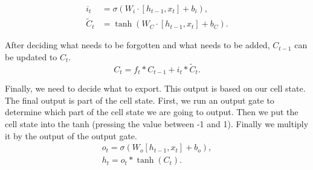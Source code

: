 \documentclass[journal,article,submit,moreauthors,pdftex]{Definitions/mdpi}
\begin{document}
\begin{equation}
    \begin{aligned}
    i_{t} &=\sigma\left(W_{i} \cdot\left[h_{t-1}, x_{t}\right]+b_{i}\right), \\
    \tilde{C}_{t} &=\tanh \left(W_{C} \cdot\left[h_{t-1}, x_{t}\right]+b_{C}\right).
    \end{aligned}
\end{equation}
\par After deciding what needs to be forgotten and what needs to be added, $C_{t-1}$ can be updated to  $C_{t}$.
\begin{equation}
    C_{t}=f_{t} * C_{t-1}+i_{t} * \tilde{C}_{t}.
\end{equation}
\par Finally, we need to decide what to export. This output is based on our cell state. The final output is part of the cell state. First, we run an output gate to determine which part of the cell state we are going to output. Then we put the cell state into the tanh (pressing the value between -1 and 1). Finally we multiply it by the output of the output gate.
\begin{equation}
    \begin{array}{l}
    o_{t}=\sigma\left(W_{o}\left[h_{t-1}, x_{t}\right]+b_{o}\right), \\
    h_{t}=o_{t} * \tanh \left(C_{t}\right).
    \end{array}
\end{equation}
\end{document}
